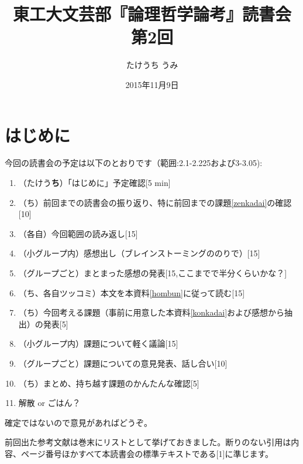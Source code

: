 \documentclass[11pt,a4paper]{jsarticle}
\begin{document}

\title{東工大文芸部『論理哲学論考』読書会 第2回}
\author{たけうち うみ}
\date{2015年11月9日}

\maketitle



\section{はじめに}\label{jo}

今回の読書会の予定は以下のとおりです（範囲:2.1-2.225および3-3.05):
\begin{enumerate}
\item
（たけう{\bf ち}）「はじめに」予定確認[5 min]
\item
（ち）前回までの読書会の振り返り、特に前回までの課題\ref{zenkadai}の確認[10]
\item
（各自）今回範囲の読み返し[15]
\item
（小グループ内）感想出し（ブレインストーミングののりで）[15]
\item
（グループごと）まとまった感想の発表[15,ここまでで半分くらいかな？]
\item
（ち、各自ツッコミ）本文を本資料\ref{hombun}に従って読む[15]
\item
（ち）今回考える課題（事前に用意した本資料\ref{konkadai}および感想から抽出）の発表[5]
\item
（小グループ内）課題について軽く議論[15]
\item
（グループごと）課題についての意見発表、話し合い[10]
\item
（ち）まとめ、持ち越す課題のかんたんな確認[5]
\item
解散 or ごはん？
\end{enumerate}%
確定ではないので意見があればどうぞ。

前回出た参考文献は巻末にリストとして挙げておきました。断りのない引用は内容、ページ番号ほかすべて本読書会の標準テキストである[1]に準じます。
\end{document}

